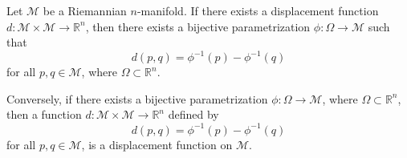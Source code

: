 \begin{lemma}\label{disp2phi}
     Let $\mathcal{M}$ be a Riemannian $n$-manifold. If there exists a displacement function $d:\mathcal{M} \times \mathcal{M} \to \mathbb{R}^n$, then there exists a bijective parametrization $\phi: \Omega \to \mathcal{M}$ such that
     \begin{equation}
         d(p,q) = \phi^{-1}(p)-\phi^{-1}(q)
     \end{equation}
     for all $p, q \in \mathcal{M}$, where $\Omega \subset \mathbb{R}^n$.

    Conversely, if there exists a bijective parametrization $\phi: \Omega \to \mathcal{M}$, where $\Omega \subset \mathbb{R}^n$, then a function $d:\mathcal{M} \times \mathcal{M} \to \mathbb{R}^n$ defined by 
    \begin{equation}
         d(p,q) = \phi^{-1}(p)-\phi^{-1}(q)
    \end{equation}
    for all $p, q \in \mathcal{M}$, is a displacement function on $\mathcal{M}$.
\end{lemma}

